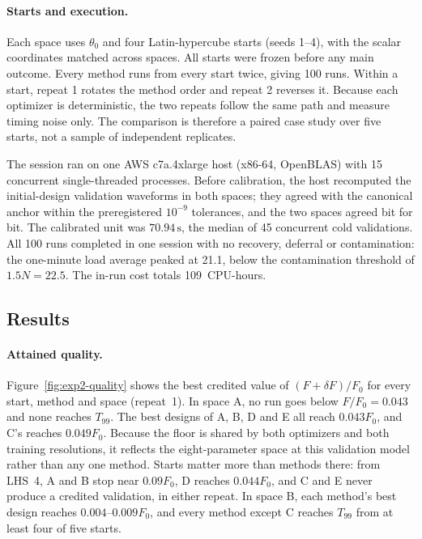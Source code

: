 \paragraph{Starts and execution.}
Each space uses $\theta_0$ and four Latin-hypercube starts (seeds 1--4),
with the scalar coordinates matched across spaces. All starts were frozen
before any main outcome. Every method runs from every start twice, giving
100 runs. Within a start, repeat 1 rotates the method order and repeat 2
reverses it. Because each optimizer is deterministic, the two repeats
follow the same path and measure timing noise only. The comparison is
therefore a paired case study over five starts, not a sample of
independent replicates.

The session ran on one AWS c7a.4xlarge host (x86-64, OpenBLAS) with 15
concurrent single-threaded processes. Before calibration, the host
recomputed the initial-design validation waveforms in both spaces; they
agreed with the canonical anchor within the preregistered $10^{-9}$
tolerances, and the two spaces agreed bit for bit. The calibrated unit was
$70.94\,\mathrm{s}$, the median of 45 concurrent cold validations. All 100
runs completed in one session with no recovery, deferral or contamination:
the one-minute load average peaked at 21.1, below the contamination
threshold of $1.5N=22.5$. The in-run cost totals
109~CPU-hours.

\subsection{Results}
\paragraph{Attained quality.}
Figure~\ref{fig:exp2-quality} shows the best credited value of
$(F+\delta F)/F_0$ for every start, method and space (repeat~1).
In space A, no run goes below $F/F_0=0.043$ and none reaches $T_{99}$.
The best designs of A, B, D and E all reach $0.043F_0$, and C's
reaches $0.049F_0$. Because the floor is shared by both optimizers and both
training resolutions, it reflects the eight-parameter space at this
validation model rather than any one method. Starts matter more than
methods there: from LHS~4, A and B stop near $0.09F_0$, D reaches
$0.044F_0$, and C and E never produce a credited validation, in either
repeat. In space B, each method's best design reaches $0.004$--$0.009F_0$,
and every method except C reaches $T_{99}$ from at least four of five
starts.

